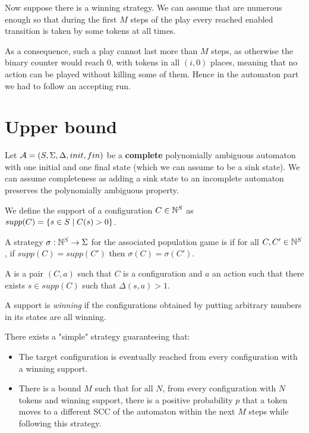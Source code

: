 \documentclass{article}
\begin{document}
Now suppose there is a winning strategy. We can assume that are numerous enough so that during the first $M$ steps of the play every reached enabled transition is taken by some tokens at all times.

As a consequence, such a play cannot last more than $M$ steps, as otherwise the binary counter would reach $0$, with tokens in all $(i,0)$ places, meaning that no action can be played without killing some of them.
Hence in the automaton part we had to follow an accepting run.

\section{Upper bound}

Let $\mathcal{A} = (S, \Sigma, \Delta, init, fin)$ be a \textbf{complete} polynomially ambiguous automaton with one initial and one final state (which we can assume to be a sink state). We can assume completeness as adding a sink state to an incomplete automaton preserves the polynomially ambiguous property.

We define the support of a configuration $C \in \mathbb{N}^S$ as $supp(C) = \{ s \in S \mid C(s) > 0 \}$.

A strategy $\sigma : \mathbb{N}^S \to \Sigma$ for the associated population game is  if for all $C, C' \in \mathbb{N}^S$, if $supp(C) = supp(C')$ then $\sigma(C) = \sigma(C')$.

A  is a pair $(C,a)$ such that $C$ is a configuration and $a$ an action such that there exists $s \in supp(C)$ such that $\Delta(s,a) > 1$.

A support is \emph{winning} if the configurations obtained by putting arbitrary numbers in its states are all winning.

\begin{lemma}
	\label{lem:simple-strat}
	There exists a "simple" strategy guaranteeing that:
	\begin{itemize}
		\item The target configuration is eventually reached from every configuration with a winning support.
		
		\item There is a bound $M$ such that for all $N$, from every configuration with $N$ tokens and winning support, there is a positive probability $p$ that a token moves to a different SCC of the automaton within the next $M$ steps while following this strategy.
	\end{itemize} 
\end{lemma}
\end{document}

